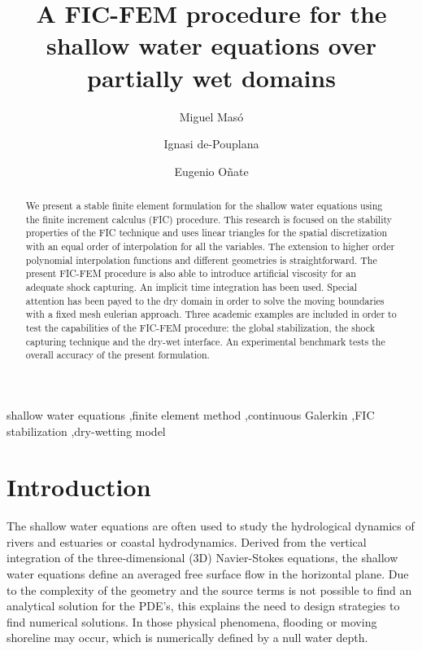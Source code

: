 \documentclass[a4paper,12pt]{elsarticle}
\begin{document}

\begin{frontmatter}
\title{A FIC-FEM procedure for the shallow water equations over partially wet domains}
\author[1,2]{Miguel Masó }
\author[1,2]{Ignasi de-Pouplana}
\author[1,2]{Eugenio Oñate}
\address[1]{Centre Int. de Mètodes Numèrics a l'Enginyeria (CIMNE), Barcelona, Spain}
\address[2]{Universitat Politècnica de Catalunya (UPC), Barcelona, Spain}

\begin{abstract}
We present a stable finite element formulation for the shallow water equations using the finite increment calculus (FIC) procedure.
This research is focused on the stability properties of the FIC technique and uses linear triangles for the spatial discretization with an equal order of interpolation for all the variables.
The extension to higher order polynomial interpolation functions and different geometries is straightforward.
The present FIC-FEM procedure is also able to introduce artificial viscosity for an adequate shock capturing.
An implicit time integration has been used. Special attention has been payed to the dry domain in order to solve the moving boundaries with a fixed mesh eulerian approach.
Three academic examples are included in order to test the capabilities of the FIC-FEM procedure: the global stabilization, the shock capturing technique and the dry-wet interface.
An experimental benchmark tests the overall accuracy of the present formulation.
\end{abstract}

\begin{keyword}
shallow water equations \sep finite element method \sep continuous Galerkin \sep FIC stabilization \sep dry-wetting model
\end{keyword}
\end{frontmatter}


\section{Introduction}


The shallow water equations are often used to study the hydrological dynamics of rivers and estuaries or coastal hydrodynamics.
Derived from the vertical integration of the three-dimensional (3D) Navier-Stokes equations, the shallow water equations define an averaged free surface flow in the horizontal plane.
Due to the complexity of the geometry and the source terms is not possible to find an analytical solution for the PDE's, this explains the need to design strategies to find numerical solutions.
In those physical phenomena, flooding or moving shoreline may occur, which is numerically defined by a null water depth.
\end{document}
